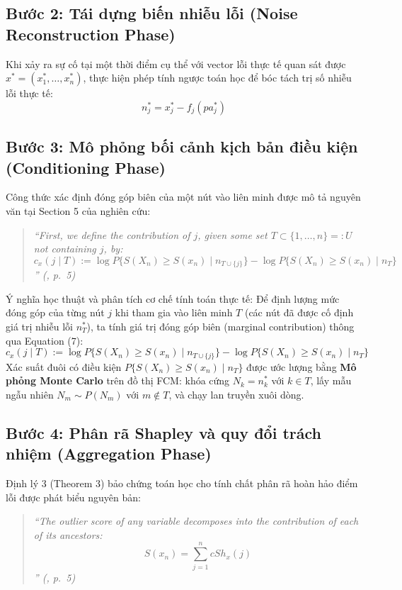 \documentclass[11pt,a4paper]{article}
\begin{document}
\subsection{Bước 2: Tái dựng biến nhiễu lỗi (Noise Reconstruction Phase)}
Khi xảy ra sự cố tại một thời điểm cụ thể với vector lỗi thực tế quan sát được $x^* = (x_1^*, \dots, x_n^*)$, thực hiện phép tính ngược toán học để bóc tách trị số nhiễu lỗi thực tế:
\begin{equation}
n_j^* = x_j^* - f_j(pa_j^*)
\end{equation}

\subsection{Bước 3: Mô phỏng bối cảnh kịch bản điều kiện (Conditioning Phase)}

Công thức xác định đóng góp biên của một nút vào liên minh được mô tả nguyên văn tại Section 5 của nghiên cứu:
\begin{quote}
\itshape
``First, we define the contribution of $j$, given some set $T \subset \{1, \dots, n\} =: U$ not containing $j$, by:
\begin{equation*}
c_x(j \mid T) := \log P\{S(X_n) \ge S(x_n) \mid n_{T \cup \{j\}}\} - \log P\{S(X_n) \ge S(x_n) \mid n_T\}
\end{equation*}'' (\cite{janzing2019rootcause}, p.~5)
\end{quote}

Ý nghĩa học thuật và phân tích cơ chế tính toán thực tế:
Để định lượng mức đóng góp của từng nút $j$ khi tham gia vào liên minh $T$ (các nút đã được cố định giá trị nhiễu lỗi $n_T^*$), ta tính giá trị đóng góp biên (marginal contribution) thông qua Equation (7):
\begin{equation}
c_x(j \mid T) := \log P\{S(X_n) \ge S(x_n) \mid n_{T \cup \{j\}}\} - \log P\{S(X_n) \ge S(x_n) \mid n_T\}
\end{equation}
Xác suất đuôi có điều kiện $P\{S(X_n) \ge S(x_n) \mid n_T\}$ được ước lượng bằng \textbf{Mô phỏng Monte Carlo} trên đồ thị FCM: khóa cứng $N_k = n_k^*$ với $k \in T$, lấy mẫu ngẫu nhiên $N_m \sim P(N_m)$ với $m \notin T$, và chạy lan truyền xuôi dòng.

\subsection{Bước 4: Phân rã Shapley và quy đổi trách nhiệm (Aggregation Phase)}
\label{sec:step4}

Định lý 3 (Theorem 3) bảo chứng toán học cho tính chất phân rã hoàn hảo điểm lỗi được phát biểu nguyên bản:
\begin{quote}
\itshape
``The outlier score of any variable decomposes into the contribution of each of its ancestors:
\begin{equation*}
S(x_n) = \sum_{j=1}^n cSh_x(j)
\end{equation*}'' (\cite{janzing2019rootcause}, p.~5)
\end{quote}
\end{document}
